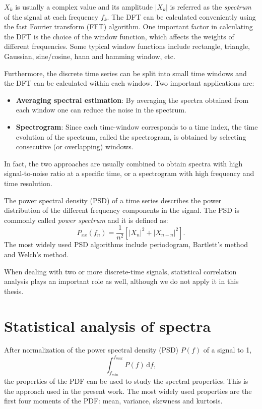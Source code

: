 $X_k$ is usually a complex value and its amplitude $|X_k|$ is referred as the \emph{spectrum} of the signal at each frequency $f_k$. The DFT can be calculated conveniently using the fast Fourier transform (FFT) algorithm. One important factor in calculating the DFT is the choice of the window function, which affects the weights of different frequencies. Some typical window functions include rectangle, triangle, Gaussian, sine/cosine, hann and hamming window, etc.

Furthermore, the discrete time series can be split into small time windows and the DFT can be calculated within each window. Two important applications are:
%
\begin{itemize}
  \item \textbf{Averaging spectral estimation}: By averaging the spectra obtained from each window one can reduce the noise in the spectrum.
  \item \textbf{Spectrogram}: Since each time-window corresponds to a time index, the time evolution of the spectrum, called the spectrogram, is obtained by selecting consecutive (or overlapping) windows.
\end{itemize}
%
\noindent In fact, the two approaches are usually combined to obtain spectra with high signal-to-noise ratio at a specific time, or a spectrogram with high frequency and time resolution.

The power spectral density (PSD) of a time series describes the power distribution of the different frequency components in the signal. The PSD is commonly called \emph{power spectrum} and it is defined as:%
\begin{equation}
  P_{xx}(f_n)=\frac{1}{n^2}\left[ |X_n|^2 + |X_{n-n}|^2 \right].
\end{equation}
\noindent The most widely used PSD algorithms include periodogram, Bartlett's method and Welch's method.

When dealing with two or more discrete-time signals, statistical correlation analysis plays an important role as well, although we do not apply it in this thesis.


\section{Statistical analysis of spectra}

After normalization of the power spectral density (PSD) $P(f)$ of a signal to 1,
\begin{equation}
  \int_{f_{min}}^{f_{max}} P(f)\,\mathrm{d} f,
\end{equation}
\noindent the properties of the PDF can be used to study the spectral properties. This is the approach used in the present work. The most widely used properties are the first four moments of the PDF: mean, variance, skewness and kurtosis.

